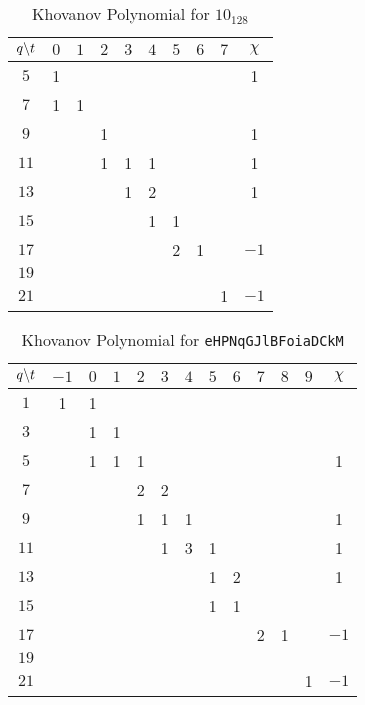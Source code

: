 \documentclass{article}
\theoremstyle{plain}
\begin{document}
        \begin{table}
            \centering
            \begin{tabular}{| c | c | c | c | c | c | c | c | c | c |}
                \hline
                $q\symbol{92}t$&$0$&$1$&$2$&$3$&$4$&$5$&$6$&$7$&$\chi$\\
                \hline
                $5$&1&&&&&&&&1\\
                \hline
                $7$&1&1&&&&&&&\\
                \hline
                $9$&&&1&&&&&&1\\
                \hline
                $11$&&&1&1&1&&&&1\\
                \hline
                $13$&&&&1&2&&&&1\\
                \hline
                $15$&&&&&1&1&&&\\
                \hline
                $17$&&&&&&2&1&&$-1$\\
                \hline
                $19$&&&&&&&&&\\
                \hline
                $21$&&&&&&&&1&$-1$\\
                \hline
            \end{tabular}
            \caption{Khovanov Polynomial for $10_{128}$}
        \end{table}
        \begin{table}
            \centering
            \begin{tabular}{| c | c | c | c | c | c | c | c | c | c | c | c | c |}
                \hline
                $q\symbol{92}t$&$-1$&$0$&$1$&$2$&$3$&$4$&$5$&$6$&$7$&$8$&$9$&$\chi$\\
                \hline
                $1$&1&1&&&&&&&&&&\\
                \hline
                $3$&&1&1&&&&&&&&&\\
                \hline
                $5$&&1&1&1&&&&&&&&1\\
                \hline
                $7$&&&&2&2&&&&&&&\\
                \hline
                $9$&&&&1&1&1&&&&&&1\\
                \hline
                $11$&&&&&1&3&1&&&&&1\\
                \hline
                $13$&&&&&&&1&2&&&&1\\
                \hline
                $15$&&&&&&&1&1&&&&\\
                \hline
                $17$&&&&&&&&&2&1&&$-1$\\
                \hline
                $19$&&&&&&&&&&&&\\
                \hline
                $21$&&&&&&&&&&&1&$-1$\\
                \hline
            \end{tabular}
            \caption{Khovanov Polynomial for \texttt{eHPNqGJlBFoiaDCkM}}
        \end{table}
\end{document}
